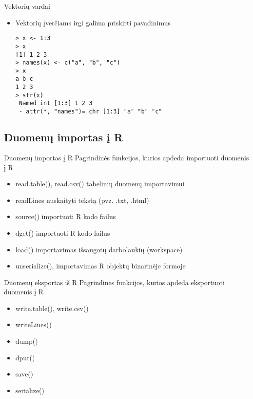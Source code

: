 \documentclass[11pt,xcolor=table]{beamer}
\begin{document}

\begin{frame}[fragile]{Vektorių vardai}
\begin{itemize}
\item Vektorių įverčiams irgi galima priskirti pavadinimus
\begin{lstlisting}
> x <- 1:3
> x
[1] 1 2 3
> names(x) <- c("a", "b", "c")
> x
a b c 
1 2 3
> str(x)
 Named int [1:3] 1 2 3
 - attr(*, "names")= chr [1:3] "a" "b" "c"
\end{lstlisting}
\end{itemize}
\end{frame}

\subsection{Duomenų importas į R}

\begin{frame}[fragile]{Duomenų importas į R}
Pagrindinės funkcijos, kurios apdeda importuoti duomenis į R
\begin{itemize}
\item read.table(), read.csv() tabelinių duomenų importavimui
\item readLines nuskaityti tekstą (pvz. .txt, .html)
\item source() importuoti R kodo failus
\item dget() importuoti R kodo failus
\item load() importavimas išsaugotų darbolaukių (workspace)
\item unserialize(), importavimas R objektų binarinėje formoje
\end{itemize}
\end{frame}


\begin{frame}[fragile]{Duomenų eksportas iš R}
Pagrindinės funkcijos, kurios apdeda eksportuoti duomenis į R
\begin{itemize}
\item write.table(), write.csv()
\item writeLines()
\item dump()
\item dput()
\item save()
\item serialize()
\end{itemize}
\end{frame}
\end{document}
